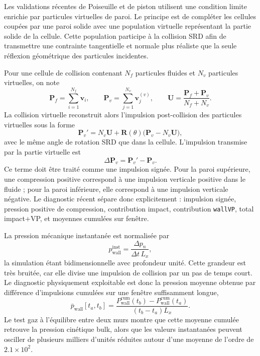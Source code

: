 \documentclass[11pt,a4paper]{article}
\begin{document}
Les validations récentes de Poiseuille et de piston utilisent une condition limite enrichie par particules virtuelles de paroi. Le principe est de compléter les cellules coupées par une paroi solide avec une population virtuelle représentant la partie solide de la cellule. Cette population participe à la collision SRD afin de transmettre une contrainte tangentielle et normale plus réaliste que la seule réflexion géométrique des particules incidentes.

Pour une cellule de collision contenant \(N_f\) particules fluides et \(N_v\) particules virtuelles, on note
\begin{equation}
  \bm P_f = \sum_{i=1}^{N_f}\bm v_i,
  \qquad
  \bm P_v = \sum_{j=1}^{N_v}\bm v_j^{(v)},
  \qquad
  \bm U = \frac{\bm P_f+\bm P_v}{N_f+N_v}.
\end{equation}
La collision virtuelle reconstruit alors l'impulsion post-collision des particules virtuelles sous la forme
\begin{equation}
  \bm P_v' = N_v\bm U + \mathbf R(\theta)\bigl(\bm P_v-N_v\bm U\bigr),
\end{equation}
avec le même angle de rotation SRD que dans la cellule. L'impulsion transmise par la partie virtuelle est
\begin{equation}
  \Delta \bm P_v = \bm P_v' - \bm P_v.
\end{equation}
Ce terme doit être traité comme une impulsion signée. Pour la paroi supérieure, une compression positive correspond à une impulsion verticale positive dans le fluide ; pour la paroi inférieure, elle correspond à une impulsion verticale négative. Le diagnostic récent sépare donc explicitement : impulsion signée, pression positive de compression, contribution impact, contribution \texttt{wallVP}, total impact+VP, et moyennes cumulées sur fenêtre.

La pression mécanique instantanée est normalisée par
\begin{equation}
  p_{\mathrm{wall}}^{\mathrm{inst}} = \frac{\Delta p_n}{\Delta t\,L_x},
\end{equation}
la simulation étant bidimensionnelle avec profondeur unité. Cette grandeur est très bruitée, car elle divise une impulsion de collision par un pas de temps court. Le diagnostic physiquement exploitable est donc la pression moyenne obtenue par différence d'impulsions cumulées sur une fenêtre suffisamment longue,
\begin{equation}
  \overline p_{\mathrm{wall}}[t_a,t_b]
  = \frac{P_{\mathrm{wall}}^{\mathrm{cum}}(t_b)-P_{\mathrm{wall}}^{\mathrm{cum}}(t_a)}{(t_b-t_a)L_x}.
\end{equation}
Le test gaz à l'équilibre entre deux murs montre que cette moyenne cumulée retrouve la pression cinétique bulk, alors que les valeurs instantanées peuvent osciller de plusieurs milliers d'unités réduites autour d'une moyenne de l'ordre de \(2.1\times10^2\).
\end{document}

